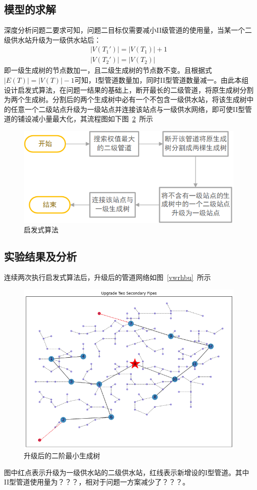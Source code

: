 \documentclass{whutmod}
\begin{document}
		\subsection{模型的求解}
		深度分析问题二要求可知，问题二目标仅需要减小II级管道的使用量，当某一个二级供水站升级为一级供水站后：
			\begin{gather*}
			|V(T_{1}')|= |V(T_{1})|+1\\
			|V(T_{2}')|=|V(T_{2})|
	        \end{gather*}
	    即一级生成树的节点数加一，且二级生成树的节点数不变。且根据式$|E(T)|=|V(T)|-1 $可知，I型管道数量加，同时II型管道数量减一。由此本组设计启发式算法，在问题一结果的基础上，断开最长的二级管道，将原生成树分割为两个生成树。分割后的两个生成树中必有一个不包含一级供水站，将该生成树中的任意一个二级站点升级为一级站点并连接该站点与一级供水网络，即可使II型管道的铺设减小量最大化，其流程图如下图~\ref{gfhd}~所示
	        \begin{figure}[H]
	        	\centering
	        	\includegraphics[width=\textwidth]{figures/2163.png}
	        	\caption{启发式算法}\label{gfhd}
	        \end{figure}
        \subsection{实验结果及分析}
        连续两次执行启发式算法后，升级后的管道网络如图~\ref{vwrhbu}~所示
		  \begin{figure}[H]
			\centering
			\includegraphics[width=\textwidth]{figures/333.png}
			\caption{升级后的二阶最小生成树}\label{gfhd}
		\end{figure}
        图中红点表示升级为一级供水站的二级供水站，红线表示新增设的I型管道。其中II型管道使用量为？？？，相对于问题一方案减少了？？？。
	
\end{document}
